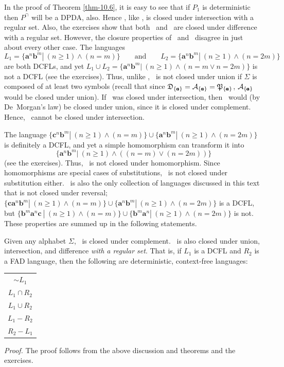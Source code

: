 In the proof of Theorem \ref{thm-10.6}, it is easy to see that if $P_1$ is deterministic
then $P^{\cap}$ will be a DPDA, also. Hence \ASIG, like \PSIG, is closed under
intersection with a regular set. Also, the exercises show that both \ASIG\ and
\PSIG\ are closed under difference with a regular set. However, the closure
properties of \ASIG\ and \PSIG\  disagree in just about every other case. The
languages
\[ L_1 = \{\pmb{a}^n\pmb{b}^m|\ (n \geq 1)\wedge(n = m)\}\qquad\text{and}\qquad
	L_2 = \{\pmb{a}^n\pmb{b}^m|\ (n \geq 1)\wedge(n = 2m)\} \]
are both DCFLs, and yet $L_1\cup L_2 = \{\pmb{a}^n\pmb{b}^m|\ (n \geq 1)\wedge(n=
m \vee n = 2m)\}$ is not a DCFL (see the exercises). Thus, unlike \PSIG, \ASIG\ 
is not closed under union if $\Sigma$ is composed of at least two symbols
(recall that since $\mathfrak{D}_{\{\pmb{a}\}} = \cal{A}_{\{\pmb{a}\}} =
\mathfrak{P}_{\{\pmb{a}\}}$, $\cal{A}_{\{\pmb{a}\}}$ would be closed under
union). If \ASIG\ was closed under intersection, then \ASIG\ would (by
De~Morgan's law) be closed under union, since it is closed under complement. Hence,
\ASIG\ cannot be closed under intersection.

The language $\{\pmb{c}^n\pmb{b}^m|\ (n \geq 1)\wedge(n=m)\}\cup\{\pmb{a}^n
\pmb{b}^m|\ (n \geq 1)\wedge(n=2m)\}$ is definitely a DCFL, and yet a simple
homomorphism can transform it into
\[ \{\pmb{a}^n\pmb{b}^m|\ (n\geq 1)\wedge((n=m)\vee(n=2m))\} \]
(see the exercises). Thus, \ASIG\ is not closed under homomorphism. Since
homomorphisms are special cases of substitutions, \ASIG\ is not closed under
substitution either. \ASIG\ is also the only collection of languages discussed
in this text that is not closed under reversal; $\{\pmb{ca}^n\pmb{b}^m|\ (n\geq 1)
\wedge(n=m)\}\cup\{\pmb{a}^n\pmb{b}^m|\ (n\geq 1)\wedge(n=2m)\}$ is a DCFL, but
$\{\pmb{b}^m\pmb{a}^n\pmb{c}\ |\ (n\geq 1)\wedge(n=m)\}\cup\{\pmb{b}^m\pmb{a}^n|\ (n
\geq 1)\wedge(n=2m)\}$ is not. These properties are summed up in the following
statements.

\begin{thm}\label{thm-10.9}
Given any alphabet $\Sigma$, \ASIG\ is closed under complement. \ASIG\ is also
closed under union, intersection, and difference \emph{with a regular set}. That
is, if $L_1$ is a DCFL and $R_2$ is a FAD language, then the following are
deterministic, context-free languages:
\begin{center}\begin{tabular}{c}
$\sim  L_1$ \\
$L_1 \cap R_2$ \\
$L_1 \cup R_2$ \\
$L_1 - R_2$ \\
$R_2 - L_1$
\end{tabular}\end{center}

\emph{Proof.} The proof follows from the above discussion and theorems and the
exercises.
\end{thm}


